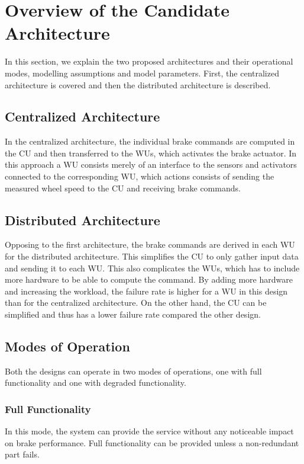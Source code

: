 
\newpage
\section{Overview of the Candidate Architecture}
\label{S2}

In this section, we explain the two proposed architectures and their operational modes, modelling assumptions and model parameters. First, the centralized architecture is covered and then the distributed architecture is described. 

\subsection{Centralized Architecture}
In the centralized architecture, the individual brake commands are computed in the CU and then transferred to the WUs, which activates the brake actuator. In this approach a WU consists merely of an interface to the sensors and activators connected to the corresponding WU, which actions consists of sending the measured wheel speed to the CU and receiving brake commands. 

\subsection{Distributed Architecture}
Opposing to the first architecture, the brake commands are derived in each WU for the distributed architecture. This simplifies the CU to only gather input data and sending it to each WU. This also complicates the WUs, which has to include more hardware to be able to compute the command. By adding more hardware and increasing the workload, the failure rate is higher for a WU in this design than for the centralized architecture. On the other hand, the CU can be simplified and thus has a lower failure rate compared the other design. 

\subsection{Modes of Operation}
Both the designs can operate in two modes of operations, one with full functionality and one with degraded functionality.
\subsubsection{Full Functionality}
In this mode, the system can provide the service without any noticeable impact on brake performance. Full functionality can be provided unless a non-redundant part fails.
